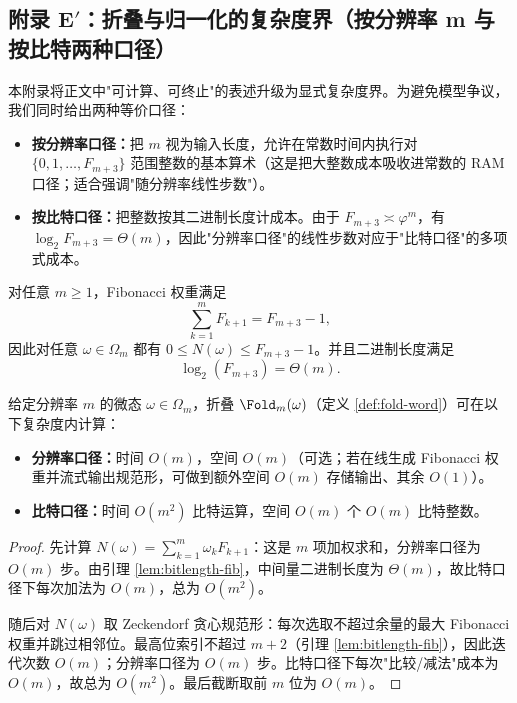 \subsection{附录 E\texorpdfstring{$'$}{'}：折叠与归一化的复杂度界（按分辨率 m 与按比特两种口径）}

本附录将正文中"可计算、可终止"的表述升级为显式复杂度界。为避免模型争议，我们同时给出两种等价口径：
\begin{itemize}
  \item \textbf{按分辨率口径：}把 $m$ 视为输入长度，允许在常数时间内执行对 $\{0,1,\dots,F_{m+3}\}$ 范围整数的基本算术（这是把大整数成本吸收进常数的 RAM 口径；适合强调"随分辨率线性步数"）。
  \item \textbf{按比特口径：}把整数按其二进制长度计成本。由于 $F_{m+3}\asymp \varphi^{m}$，有 $\log_2 F_{m+3}=\Theta(m)$，因此"分辨率口径"的线性步数对应于"比特口径"的多项式成本。
\end{itemize}

\begin{lemma}[权重与数值大小]\label{lem:bitlength-fib}
对任意 $m\ge 1$，Fibonacci 权重满足
\[
\sum_{k=1}^m F_{k+1}=F_{m+3}-1,
\]
因此对任意 $\omega\in\Omega_m$ 都有 $0\le N(\omega)\le F_{m+3}-1$。并且二进制长度满足
\[
\log_2(F_{m+3})=\Theta(m).
\]
\end{lemma}

\begin{proposition}\label{prop:fold-complexity}
给定分辨率 $m$ 的微态 $\omega\in\Omega_m$，折叠 $\Fold_m(\omega)$（定义 \ref{def:fold-word}）可在以下复杂度内计算：
\begin{itemize}
  \item \textbf{分辨率口径：}时间 $O(m)$，空间 $O(m)$（可选；若在线生成 Fibonacci 权重并流式输出规范形，可做到额外空间 $O(m)$ 存储输出、其余 $O(1)$）。
  \item \textbf{比特口径：}时间 $O(m^2)$ 比特运算，空间 $O(m)$ 个 $O(m)$ 比特整数。
\end{itemize}
\end{proposition}

\begin{proof}
先计算 $N(\omega)=\sum_{k=1}^m \omega_k F_{k+1}$：这是 $m$ 项加权求和，分辨率口径为 $O(m)$ 步。由引理 \ref{lem:bitlength-fib}，中间量二进制长度为 $\Theta(m)$，故比特口径下每次加法为 $O(m)$，总为 $O(m^2)$。

随后对 $N(\omega)$ 取 Zeckendorf 贪心规范形：每次选取不超过余量的最大 Fibonacci 权重并跳过相邻位。最高位索引不超过 $m+2$（引理 \ref{lem:bitlength-fib}），因此迭代次数 $O(m)$；分辨率口径为 $O(m)$ 步。比特口径下每次"比较/减法"成本为 $O(m)$，故总为 $O(m^2)$。最后截断取前 $m$ 位为 $O(m)$。
\end{proof}

